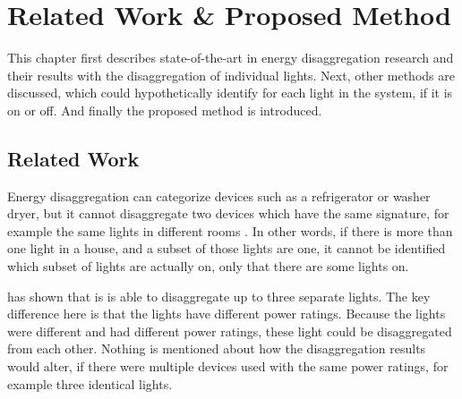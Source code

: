 
\chapter{Related Work \& Proposed Method}
\label{chp:related-work}


















This chapter first describes state-of-the-art in energy disaggregation research and their results with the disaggregation of individual lights.
Next, other methods are discussed, which could hypothetically identify for each light in the system, if it is on or off.
And finally the proposed method is introduced.


	\section{Related Work}

		Energy disaggregation can categorize devices such as a refrigerator or washer dryer, but it cannot disaggregate two devices which have the same signature, for example the same lights in different rooms \cite{froehlich2011disaggregated}.
		In other words, if there is more than one light in a house, and a subset of those lights are one, it cannot be identified which subset of lights are actually on, only that there are some lights on.


		\cite{shao2013temporal} has shown that is is able to disaggregate up to three separate lights.
		The key difference here is that the lights have different power ratings.
		Because the lights were different and had different power ratings, these light could be disaggregated from each other.
		Nothing is mentioned about how the disaggregation results would alter, if there were multiple devices used with the same power ratings, for example three identical lights.


